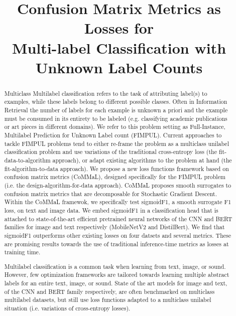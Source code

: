 \documentclass[sigconf,natbib,screen=true,review=true,anonymous]{acmart}
\begin{document}
\title[Confusion Matrix Metrics as Losses for Multi-label Classification]{Confusion Matrix Metrics as Losses for \\ Multi-label Classification with Unknown Label Counts}


\begin{abstract}

Multiclass Multilabel classification refers to the task of attributing label(s) to examples, while these labels belong to different possible classes. Often in Information Retrieval the number of labels for each example is unknown a priori and the example must be consumed in its entirety to be labeled (e.g. classifying academic publications or art pieces in different domains). We refer to this problem setting as Full-Instance, Multilabel Prediction for Unknown Label count (FIMPUL). Current approaches to tackle FIMPUL problems tend to either re-frame the problem as a multiclass unilabel classification problem and use variations of the traditional cross-entropy loss (the fit-data-to-algorithm approach), or adapt existing algorithms to the problem at hand (the fit-algorithm-to-data approach). We propose a new loss functions framework based on confusion matrix metrics (CoMMaL), designed specifically for the FIMPUL problem (i.e. the design-algorithm-for-data approach). CoMMaL proposes smooth surrogates to confusion matrix metrics that are decomposable for Stochastic Gradient Descent. Within the CoMMaL framewok, we specifically test sigmoidF1, a smooth surrogate F1 loss, on text and image data. We embed sigmoidF1 in a classification head that is attached to state-of-the-art efficient pretrained neural networks of the CNN and BERT families for image and text respectively (MobileNetV2 and DistilBert). We find that sigmoidF1 outperforms other existing losses on four datsets and several metrics. These are promising results towards the use of traditional inference-time metrics as losses at training time. 
  
Multilabel classification is a common task when learning from text, image, or sound. However, few optimization frameworks are tailored towards learning multiple abstract labels for an entire text, image, or sound. State of the art models for image and text, of the CNN and BERT family respectively, are often benchmarked on multiclass multilabel datasets, but still use loss functions adapted to a multiclass unilabel situation (i.e. variations of cross-entropy losses).


\end{abstract}
\end{document}
